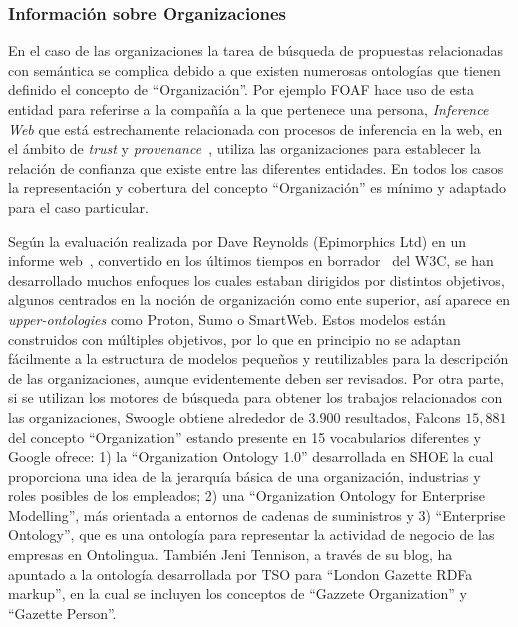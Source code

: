 \subsubsection{Información sobre Organizaciones}\label{sect:orgs}
En el caso de las organizaciones la tarea de búsqueda de propuestas relacionadas
con semántica se complica debido a que existen numerosas ontologías que tienen
definido el concepto de ``Organización''. Por ejemplo \gls{FOAF} hace uso de esta entidad
para referirse a la compañía a la que pertenece una persona, \textit{Inference Web} que 
está estrechamente relacionada con procesos de inferencia en la web, en el ámbito de \textit{trust} y \textit{provenance}~\cite{prov-group}, 
utiliza las organizaciones para establecer la relación de confianza que existe entre las diferentes entidades. En todos los casos
la representación y cobertura del concepto ``Organización'' es mínimo y adaptado
para el caso particular.

Según la evaluación realizada por Dave Reynolds (Epimorphics Ltd) en un informe web~\cite{org-ontology}, convertido 
en los últimos tiempos en borrador~\cite{dave-w3c} del \gls{W3C}, se han desarrollado muchos enfoques los cuales estaban dirigidos por distintos objetivos, algunos centrados 
en la noción de organización como ente superior, así aparece en \textit{upper-ontologies} como Proton, Sumo o SmartWeb. Estos modelos están construidos con múltiples objetivos, 
por lo que en principio no se adaptan fácilmente a la estructura de modelos pequeños y reutilizables 
para la descripción de las organizaciones, aunque evidentemente deben ser revisados. Por otra parte,
si se utilizan los motores de búsqueda para obtener los trabajos relacionados con las organizaciones, Swoogle obtiene 
alrededor de $3.900$ resultados, Falcons $15,881$ del concepto ``Organization''
estando presente en 15 vocabularios diferentes y Google ofrece: 1) la ``Organization Ontology 1.0'' desarrollada
en SHOE la cual proporciona una idea de la jerarquía básica de una organización, industrias y roles posibles de los empleados;
2) una ``Organization Ontology for Enterprise Modelling'', más orientada a entornos de cadenas
de suministros y 3) ``Enterprise Ontology'', que es una ontología para representar la actividad de negocio
de las empresas en Ontolingua. También Jeni Tennison, a través de su blog, ha apuntado a la ontología
desarrollada por TSO para ``London Gazette \gls{RDFa} markup'', en la cual se incluyen los conceptos de ``Gazzete Organization''
y ``Gazette Person''. 

